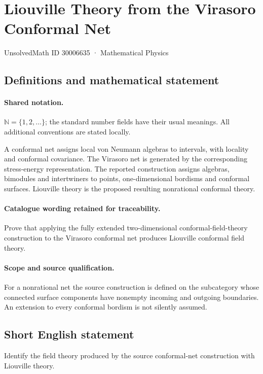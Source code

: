 \documentclass[11pt]{article}
\begin{document}
\setcounter{section}{30006634}
\section{Liouville Theory from the Virasoro Conformal Net}\label{30006635}
{\small UnsolvedMath ID 30006635 · Mathematical Physics}
\subsection{Definitions and mathematical statement}

\paragraph{Shared notation.}$\mathbb N=\{1,2,\ldots\}$; the standard number fields have their usual meanings. All additional conventions are stated locally.


A conformal net assigns local von Neumann algebras to intervals, with locality and conformal covariance. The Virasoro net is generated by the corresponding stress-energy representation. The reported construction assigns algebras, bimodules and intertwiners to points, one-dimensional bordisms and conformal surfaces. Liouville theory is the proposed resulting nonrational conformal theory.

\paragraph{Catalogue wording retained for traceability.}
Prove that applying the fully extended two-dimensional conformal-field-theory construction to the Virasoro conformal net produces Liouville conformal field theory.

\paragraph{Scope and source qualification.}For a nonrational net the source construction is defined on the subcategory whose connected surface components have nonempty incoming and outgoing boundaries. An extension to every conformal bordism is not silently assumed.
\subsection{Short English statement}
Identify the field theory produced by the source conformal-net construction with Liouville theory.
\end{document}
